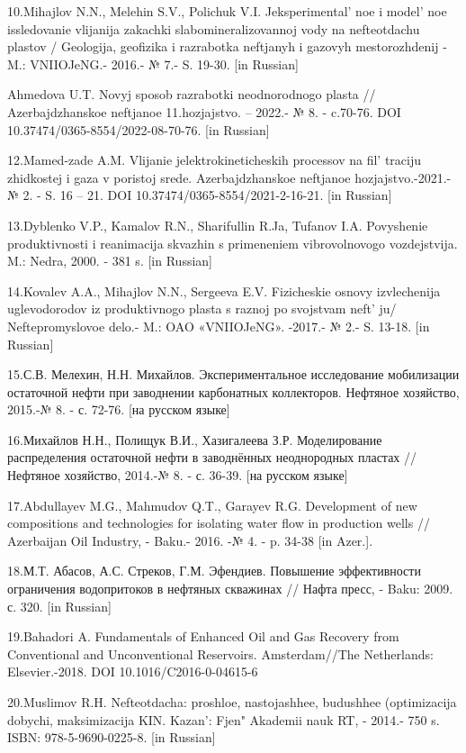{{10.Mihajlov N.N., Melehin S.V., Polichuk V.I.
Jeksperimental' noe i model' noe
issledovanie vlijanija zakachki slabomineralizovannoj vody na
nefteotdachu plastov / Geologija, geofizika i razrabotka neftjanyh i
gazovyh mestorozhdenij -M.: VNIIOJeNG.- 2016.- № 7.- S. 19-30. {[}in
Russian{]}

Ahmedova U.T. Novyj sposob razrabotki neodnorodnogo plasta //
Azerbajdzhanskoe neftjanoe 11.hozjajstvo. -- 2022.- № 8. - c.70-76. DOI
10.37474/0365-8554/2022-08-70-76. {[}in Russian{]}

12.Mamed-zade A.M. Vlijanie jelektrokineticheskih processov na
fil' traciju zhidkostej i gaza v poristoj srede.
Azerbajdzhanskoe neftjanoe hozjajstvo.-2021.- № 2. - S. 16 -- 21. DOI
10.37474/0365-8554/2021-2-16-21. {[}in Russian{]}

13.Dyblenko V.P., Kamalov R.N., Sharifullin R.Ja, Tufanov I.A.
Povyshenie produktivnosti i reanimacija skvazhin s primeneniem
vibrovolnovogo vozdejstvija. M.: Nedra, 2000. - 381 s. {[}in Russian{]}

14.Kovalev A.A., Mihajlov N.N., Sergeeva E.V. Fizicheskie osnovy
izvlechenija uglevodorodov iz produktivnogo plasta s raznoj po svojstvam
neft' ju/ Neftepromyslovoe delo.- M.: OAO «VNIIOJeNG».
-2017.- № 2.- S. 13-18. {[}in Russian{]}

15.С.В. Мелехин, Н.Н. Михайлов. Экспериментальное исследование
мобилизации остаточной нефти при заводнении карбонатных коллекторов.
Нефтяное хозяйство, 2015.-№ 8. - с. 72-76. {[}на русском языке{]}

16.Михайлов Н.Н., Полищук В.И., Хазигалеева З.Р. Моделирование
распределения остаточной нефти в заводнённых неоднородных пластах //
Нефтяное хозяйство, 2014.-№ 8. - с. 36-39. {[}на русском языке{]}

17.Abdullayev M.G., Mahmudov Q.T., Garayev R.G. Development of new
compositions and technologies for isolating water flow in production
wells // Azerbaijan Oil Industry, - Baku.- 2016. -№ 4. - p. 34-38 {[}in
Azer.{]}.

18.М.Т. Абасов, А.С. Стреков, Г.М. Эфендиев. Повышение эффективности
ограничения водопритоков в нефтяных скважинах // Нафта пресс, - Baku:
2009. с. 320. {[}in Russian{]}

19.Bahadori A. Fundamentals of Enhanced Oil and Gas Recovery from
Conventional and Unconventional Reservoirs. Amsterdam//The Netherlands:
Elsevier.-2018. DOI 10.1016/C2016-0-04615-6

20.Muslimov R.H. Nefteotdacha: proshloe, nastojashhee, budushhee
(optimizacija dobychi, maksimizacija KIN. Kazan': Fjen"
Akademii nauk RT, - 2014.- 750 s. ISBN: 978-5-9690-0225-8. {[}in
Russian{]}

}}
